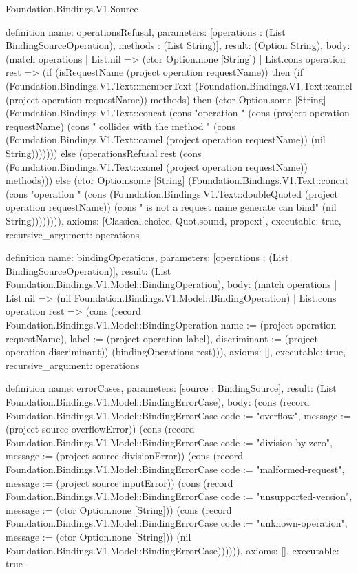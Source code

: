\begin{lexlean}{Foundation.Bindings.V1.Source}
\begin{semanticmodule}
definition{
  name: operationsRefusal,
  parameters: [operations : (List BindingSourceOperation), methods : (List String)],
  result: (Option String),
  body: (match operations
    | List.nil => (ctor Option.none [String])
    | List.cons operation rest => (if (isRequestName (project operation requestName)) then (if (Foundation.Bindings.V1.Text::memberText (Foundation.Bindings.V1.Text::camel (project operation requestName)) methods) then (ctor Option.some [String] (Foundation.Bindings.V1.Text::concat (cons "operation " (cons (project operation requestName) (cons " collides with the method " (cons (Foundation.Bindings.V1.Text::camel (project operation requestName)) (nil String))))))) else (operationsRefusal rest (cons (Foundation.Bindings.V1.Text::camel (project operation requestName)) methods))) else (ctor Option.some [String] (Foundation.Bindings.V1.Text::concat (cons "operation " (cons (Foundation.Bindings.V1.Text::doubleQuoted (project operation requestName)) (cons " is not a request name generate can bind" (nil String)))))))),
  axioms: [Classical.choice, Quot.sound, propext],
  executable: true,
  recursive_argument: operations
}

definition{
  name: bindingOperations,
  parameters: [operations : (List BindingSourceOperation)],
  result: (List Foundation.Bindings.V1.Model::BindingOperation),
  body: (match operations
    | List.nil => (nil Foundation.Bindings.V1.Model::BindingOperation)
    | List.cons operation rest => (cons (record Foundation.Bindings.V1.Model::BindingOperation {name := (project operation requestName), label := (project operation label), discriminant := (project operation discriminant)}) (bindingOperations rest))),
  axioms: [],
  executable: true,
  recursive_argument: operations
}

definition{
  name: errorCases,
  parameters: [source : BindingSource],
  result: (List Foundation.Bindings.V1.Model::BindingErrorCase),
  body: (cons (record Foundation.Bindings.V1.Model::BindingErrorCase {code := "overflow", message := (project source overflowError)}) (cons (record Foundation.Bindings.V1.Model::BindingErrorCase {code := "division-by-zero", message := (project source divisionError)}) (cons (record Foundation.Bindings.V1.Model::BindingErrorCase {code := "malformed-request", message := (project source inputError)}) (cons (record Foundation.Bindings.V1.Model::BindingErrorCase {code := "unsupported-version", message := (ctor Option.none [String])}) (cons (record Foundation.Bindings.V1.Model::BindingErrorCase {code := "unknown-operation", message := (ctor Option.none [String])}) (nil Foundation.Bindings.V1.Model::BindingErrorCase)))))),
  axioms: [],
  executable: true
}


\end{semanticmodule}
\end{lexlean}
